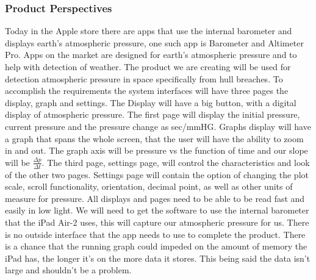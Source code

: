 \documentclass[onecolumn, draftclsnofoot,10pt, compsoc]{IEEEtran}
\begin{document}
\subsubsection{Product Perspectives}
Today in the Apple store there are apps that use the internal barometer and displays earth's atmospheric pressure, one such app is Barometer and Altimeter Pro.
Apps on the market are designed for earth's atmospheric pressure and to help with detection of weather.
The product we are creating will be used for detection atmospheric pressure in space specifically from hull breaches.
To accomplish the requirements the system interfaces will have three pages the display, graph and settings.
The Display will have a big button, with a digital display of atmospheric pressure.
The first page will display the initial pressure, current pressure and the pressure change as sec/mmHG.
Graphs display will have a graph that spans the whole screen, that the user will have the ability to zoom in and out.
 The graph axis will be pressure vs the function of time and our slope will be $\frac{\Delta p}{\Delta t}$.
 The third page, settings page, will control the characteristics and look of the other two pages.
Settings page will contain the option of changing the plot scale, scroll functionality, orientation, decimal point, as well as other units of measure for pressure.
 All displays and pages need to be able to be read fast and easily in low light.
We will need to get the software to use the internal barometer that the iPad Air-2 uses, this will capture our atmospheric pressure for us.
There is no outside interface that the app needs to use to complete the product.
There is a chance that the running graph could impeded on the amount of memory the iPad has, the longer it's on the more data it stores.
This being said the data isn't large and shouldn't be a problem.
\end{document}
